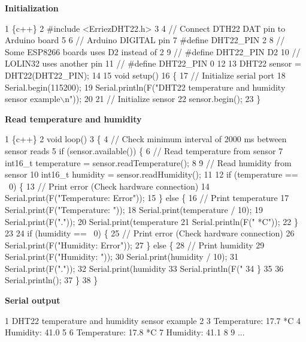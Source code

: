 {\bfseries Initialization}


\begin{DoxyCode}
1 \{c++\}
2 #include <ErriezDHT22.h>
3 
4 // Connect DTH22 DAT pin to Arduino board
5 
6 // Arduino DIGITAL pin
7 #define DHT22\_PIN      2
8 // Some ESP8266 boards uses D2 instead of 2
9 // #define DHT22\_PIN   D2
10 // LOLIN32 uses another pin
11 // #define DHT22\_PIN   0
12 
13 DHT22 sensor = DHT22(DHT22\_PIN);
14 
15 void setup()
16 \{
17     // Initialize serial port
18     Serial.begin(115200);
19     Serial.println(F("DHT22 temperature and humidity sensor example\(\backslash\)n"));
20 
21     // Initialize sensor
22     sensor.begin();
23 \}
\end{DoxyCode}


{\bfseries Read temperature and humidity}


\begin{DoxyCode}
1 \{c++\}
2 void loop()
3 \{
4     // Check minimum interval of 2000 ms between sensor reads
5     if (sensor.available()) \{
6         // Read temperature from sensor
7         int16\_t temperature = sensor.readTemperature();
8 
9         // Read humidity from sensor
10         int16\_t humidity = sensor.readHumidity();
11 
12         if (temperature == ~0) \{
13             // Print error (Check hardware connection)
14             Serial.print(F("Temperature: Error"));
15         \} else \{
16             // Print temperature
17             Serial.print(F("Temperature: "));
18             Serial.print(temperature / 10);
19             Serial.print(F("."));
20             Serial.print(temperature %
21             Serial.println(F(" *C"));
22         \}
23 
24         if (humidity == ~0) \{
25             // Print error (Check hardware connection)
26             Serial.print(F("Humidity: Error"));
27         \} else \{
28             // Print humidity
29             Serial.print(F("Humidity: "));
30             Serial.print(humidity / 10);
31             Serial.print(F("."));
32             Serial.print(humidity %
33             Serial.println(F(" %
34         \}
35 
36         Serial.println();
37       \}
38 \}
\end{DoxyCode}


{\bfseries Serial output}


\begin{DoxyCode}
1 DHT22 temperature and humidity sensor example
2 
3 Temperature: 17.7 *C
4 Humidity: 41.0 %
5 
6 Temperature: 17.8 *C
7 Humidity: 41.1 %
8 
9 ...
\end{DoxyCode}


